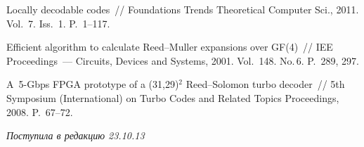 \begin{multicols}{2}
{{\begin{thebibliography}{99}
  Locally decodable codes~// {Foundations  Trends Theoretical Computer Sci.}, 
2011. Vol.~7. Iss.~1.  P.~1--117.

 Efficient algorithm to calculate Reed--Muller
expansions over GF(4)~// IEE Proceedings~--- Circuits, Devices and  
Systems, 2001. Vol.~148. No.\,6. P.~289, 297.

 A~5-Gbps FPGA prototype of a (31,29)$^2$ Reed--Solomon turbo decoder~//
5th Symposium (International) on Turbo Codes and Related Topics Proceedings, 2008.
P.~67--72.


 

\end{thebibliography}
} }

\end{multicols}

 \label{end\stat}

\hfill{\small\textit{Поступила в редакцию 23.10.13}}
\renewcommand{\figurename}{\protect\bf Рис.}
